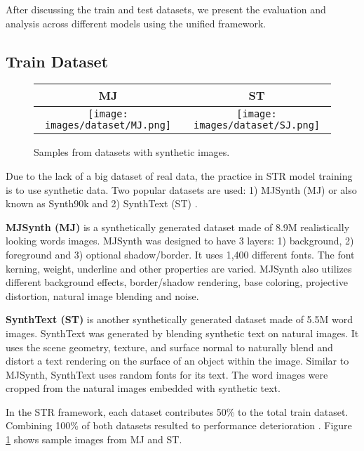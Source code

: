\documentclass[runningheads]{llncs}
\begin{document}
After discussing the train and test datasets, we present the evaluation and analysis across different models using the unified framework. 

\subsection{Train Dataset}



\begin{figure}
    \centering
\begin{tabular}{| c | c  |}
\hline
MJ & ST \\
\hline
\texttt{[image: images/dataset/MJ.png]} & \texttt{[image: images/dataset/SJ.png]} \\
\hline

\end{tabular}    
    \caption{Samples from datasets with synthetic images.}
    \label{fig:synth_dataset}
\end{figure}


Due to the lack of a big dataset of real data, the practice in STR model training is to use synthetic data. Two popular datasets are used: 1) MJSynth (MJ) \cite{jaderberg2014synthetic} or also known as Synth90k and 2) SynthText (ST) \cite{gupta2016synthetic}. 

\textbf{MJSynth (MJ)} is a synthetically generated dataset made of 8.9M realistically looking  words images. MJSynth was designed to have 3 layers: 1) background, 2) foreground and 3) optional shadow/border. It uses 1,400 different fonts. The font kerning, weight, underline and other properties are varied. MJSynth also utilizes different background effects, border/shadow rendering, base coloring, projective distortion, natural image blending and noise.

\textbf{SynthText (ST)} is another synthetically generated dataset made of 5.5M word images. SynthText was generated by blending synthetic text on natural images. It uses the scene geometry, texture, and surface normal to naturally blend and distort a text rendering on the surface of an object within the image. Similar to MJSynth, SynthText uses random fonts for its text. The word images were cropped from the natural images embedded with synthetic text.

In the STR framework, each dataset contributes 50\% to the total train dataset. Combining 100\% of both datasets resulted to performance deterioration \cite{baek2019wrong}. Figure \ref{fig:synth_dataset} shows sample images from MJ and ST.
\end{document}
